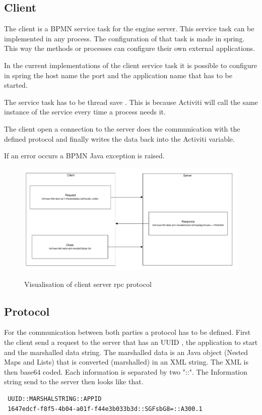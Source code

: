 \documentclass[paper=a4,twoside=false,BCOR=0mm,DIV=calc,fontsize=12pt]{scrartcl}
\begin{document}
\subsection{Client}
The client is a BPMN service task for the engine server. This service task can be implemented in any process. 
The configuration of that task is made in spring. This way the methods or processes can configure their own external applications.

In the current implementations of the client service task it is possible to configure in spring the host name the port and the application name that has to be started.

The service task has to be thread save \cite{treadsave}. This is because Activiti will call the same instance of the service every time a process needs it. 

The client open a connection to the server does the communication with the defined protocol and finally writes the data back into the Activiti variable.

If an error occurs a BPMN Java exception is raised.

\begin{figure}
    \begin{center}
       \includegraphics[width=1\textwidth]{./img/clientServerProtocoll.pdf}\\
    \end{center}
  \caption{Visualisation of client server rpc protocol}
  \label{protocol}
\end{figure} 

\subsection{Protocol}
For the communication between both parties a protocol has to be defined. 
First the client send a request to the server that has an UUID \cite{uuid}, the application to start and the marshalled data string. The marshalled data is an Java object (Nested Maps and Lists) that is converted (marshalled) in an XML string. The XML is then base64 \cite{base64} coded.
Each information is separated by two "::". The Information string send to the server then looks like that.
\begin{verbatim}
 UUID::MARSHALSTRING::APPID
 1647edcf-f8f5-4b04-a01f-f44e3b033b3d::SGFsbG8=::A300.1
\end{verbatim}
\end{document}
